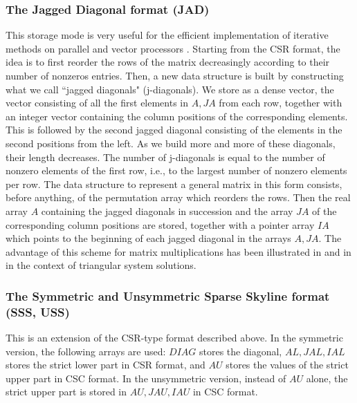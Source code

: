 \subsubsection{The Jagged Diagonal format (JAD)} 
This storage mode is very useful for the efficient implementation
of iterative methods on  parallel and vector processors
\cite{Saad-Boeing}. Starting from the CSR format, the idea is to 
first reorder the rows of the matrix decreasingly according to their 
number of nonzeros entries. Then, a new data structure is built 
by constructing what we call ``jagged diagonals" (j-diagonals).
We store as a dense vector, the vector consisting of all
the first elements in $A, JA$ from each row, together with an integer 
vector containing the column positions of the corresponding 
elements. This is followed by the second jagged  diagonal consisting of the
elements in the second positions from the left. As we build more and
more of these diagonals, their length decreases.  The number of
j-diagonals is equal to the number of nonzero elements of the first
row, i.e., to the largest number of nonzero elements per row.  The
data structure to represent a general matrix in this form consists,
before anything, of the permutation array which reorders the rows.
Then the real array $A$ containing the jagged diagonals in succession
and the array $JA$ of the corresponding column positions are stored,
together with a pointer array $ IA $ which points to the beginning of
each jagged diagonal in the arrays $A, JA$. The advantage of this
scheme for matrix multiplications has been illustrated in
\cite{Saad-Boeing} and in \cite{Anderson-Saad} in the 
context of triangular system solutions.

\subsubsection{The Symmetric and Unsymmetric Sparse Skyline format
(SSS, USS)} 

This is an extension of the CSR-type format described above.
In the symmetric version, the following arrays are used:
$DIAG$ stores the diagonal,
$AL, JAL, IAL$ stores the strict lower part in CSR format, and
$AU$ stores the values of the strict upper part in CSC format.
In the unsymmetric version, instead of $AU$ alone, the strict upper part
is stored in $AU, JAU, IAU$ in CSC format.

